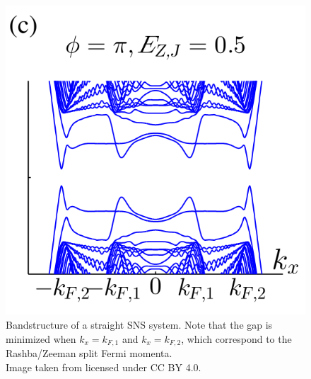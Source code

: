         \begin{figure}[!htb]
        \centering
        \includegraphics[width=0.5\columnwidth]{figures/pientka_bandstructure}
        \caption{Bandstructure of a straight SNS system.
        Note that the gap is minimized when $k_x=k_{F,1}$ and $k_x=k_{F,2}$, which correspond to the Rashba/Zeeman split Fermi momenta.\\
        Image taken from \cite{pientka_topological_2017} licensed under CC BY 4.0.
        }
        \label{fig:pientka_bandstructure}
        \end{figure}